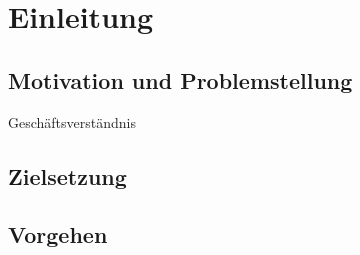 \listoftodos


 
\chapter{Einleitung}
\label{chap:Einleitung}

	\section{Motivation und Problemstellung}
	\label{sec:MotivationUndProblemstellung}

	Geschäftsverständnis

	\section{Zielsetzung}
	\label{sec:Zielsetzung}

	\section{Vorgehen}
	\label{sec:Vorgehen}



